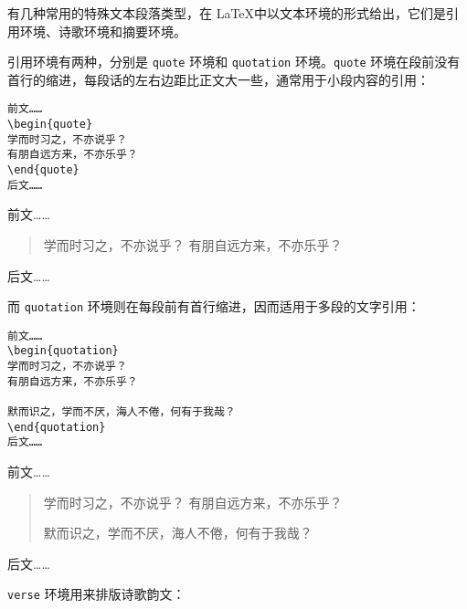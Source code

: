 有几种常用的特殊文本段落类型，在 \LaTeX 中以文本环境的形式给出，它们是引用环境、诗歌环境和摘要环境。

引用环境有两种，分别是 \verb|quote| 环境和 \verb|quotation| 环境。\verb|quote| 环境在段前没有首行的缩进，每段话的左右边距比正文大一些，通常用于小段内容的引用：

\begin{minipage}[t]{0.45\textwidth}
\begin{lstlisting}
前文……
\begin{quote}
学而时习之，不亦说乎？
有朋自远方来，不亦乐乎？
\end{quote}
后文……
\end{lstlisting}
\end{minipage}
\hfill
\begin{minipage}[t]{0.45\textwidth}
    前文……
    \begin{quote}
    学而时习之，不亦说乎？
    有朋自远方来，不亦乐乎？
    \end{quote}
    后文……
\end{minipage}

而 \verb|quotation| 环境则在每段前有首行缩进，因而适用于多段的文字引用：

\begin{minipage}[t]{0.45\textwidth}
\begin{lstlisting}
前文……
\begin{quotation}
学而时习之，不亦说乎？
有朋自远方来，不亦乐乎？

默而识之，学而不厌，海人不倦，何有于我哉？
\end{quotation}
后文……
\end{lstlisting}
\end{minipage}
\hfill
\begin{minipage}[t]{0.45\textwidth}
    前文……
    \begin{quotation}
    学而时习之，不亦说乎？
    有朋自远方来，不亦乐乎？
    
    默而识之，学而不厌，海人不倦，何有于我哉？
    \end{quotation}
    后文……
\end{minipage}

\verb|verse| 环境用来排版诗歌韵文：

